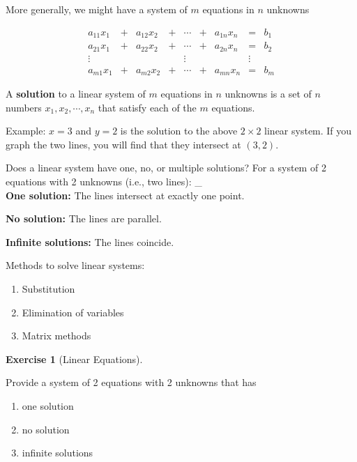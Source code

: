 \documentclass[
]{book}
\providecommand{\tightlist}{%
  \setlength{\itemsep}{0pt}\setlength{\parskip}{0pt}}
\theoremstyle{definition}
\theoremstyle{definition}
\theoremstyle{definition}
\newtheorem{exercise}{Exercise}[chapter]
\theoremstyle{definition}
\theoremstyle{remark}
\begin{document}
More generally, we might have a system of \(m\) equations in \(n\) unknowns

\[\begin{matrix}
            a_{11}x_1  & + & a_{12}x_2 & + & \cdots & + & a_{1n}x_n & = & b_1\\
            a_{21}x_1  & + & a_{22}x_2 & + & \cdots & + & a_{2n}x_n & = & b_2\\
            \vdots     &   &     &   & \vdots &   &     & \vdots & \\
            a_{m1}x_1  & + & a_{m2}x_2 & + & \cdots & + & a_{mn}x_n & = & b_m
            \end{matrix}\]

A \textbf{solution} to a linear system of \(m\) equations in \(n\) unknowns is a set of \(n\) numbers \(x_1, x_2, \cdots, x_n\) that satisfy each of the \(m\) equations.

Example: \(x=3\) and \(y=2\) is the solution to the above \(2\times 2\) linear system. If you graph the two lines, you will find that they intersect at \((3,2)\).

Does a linear system have one, no, or multiple solutions? For a system of 2 equations with 2 unknowns (i.e., two lines):
\_\\
\textbf{One solution:} The lines intersect at exactly one point.

\textbf{No solution:} The lines are parallel.

\textbf{Infinite solutions:} The lines coincide.

Methods to solve linear systems:

\begin{enumerate}
\def\labelenumi{\arabic{enumi}.}
\tightlist
\item
  Substitution
\item
  Elimination of variables
\item
  Matrix methods
\end{enumerate}

\begin{exercise}[Linear Equations]
\protect\hypertarget{exr:lineareq}{}{\label{exr:lineareq} {} }

Provide a system of 2 equations with 2 unknowns that has

\begin{enumerate}
\def\labelenumi{\arabic{enumi}.}
\item
  one solution
\item
  no solution
\item
  infinite solutions
\end{enumerate}
\end{exercise}
\end{document}
